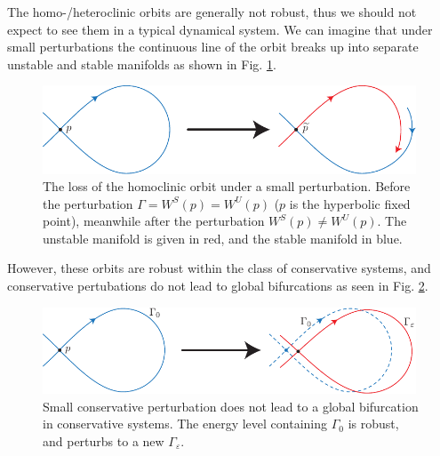\begin{remark}[]
	The homo-/heteroclinic orbits are generally not robust, thus we should not expect to see them in a typical dynamical system. We can imagine that under small perturbations the continuous line of the orbit breaks up into separate unstable and stable manifolds as shown in Fig. \ref{fig:pd_robust}.
	\begin{figure}[h!]
		\centering
		\includegraphics[width=0.99\textwidth]{figures/ch4/9pd_robust.pdf}
		\caption{The loss of the homoclinic orbit under a small perturbation. Before the perturbation $\Gamma=W^{S}(p)=W^{U}(p)$ ($p$ is the hyperbolic fixed point), meanwhile after the perturbation $W ^{S}(p) \neq W^{U} (p)$. The unstable manifold is given in red, and the stable manifold in blue.}
		\label{fig:pd_robust}
	\end{figure}
	However, these orbits are robust within the class of conservative systems, and conservative pertubations do not lead to global bifurcations as seen in Fig. \ref{fig:pd_conservative}.
	\begin{figure}[h!]
		\centering
		\includegraphics[width=0.99\textwidth]{figures/ch4/10pd_conservative.pdf}
		\caption{Small conservative perturbation does not lead to a global bifurcation in conservative systems. The energy level containing $\Gamma_0$ is robust, and perturbs to a new $\Gamma_\varepsilon$.}
		\label{fig:pd_conservative}
	\end{figure}
	
\end{remark}
